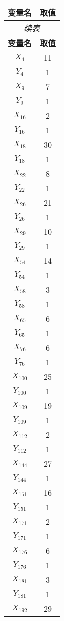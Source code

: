 \documentclass[a4paper,10pt]{article}
\begin{document}
\begin{center}
\begin{longtable}{cc}
\toprule
\textbf{变量名} & \textbf{取值} \\
\midrule
\endfirsthead
\multicolumn{2}{c}{\textit{续表}} \\
\toprule
\textbf{变量名} & \textbf{取值} \\
\midrule
\endhead
\bottomrule
\endfoot
\bottomrule
\endlastfoot
$X_{4}$ & 11 \\
$Y_{4}$ & 1 \\
$X_{9}$ & 7 \\
$Y_{9}$ & 1 \\
$X_{16}$ & 2 \\
$Y_{16}$ & 1 \\
$X_{18}$ & 30 \\
$Y_{18}$ & 1 \\
$X_{22}$ & 8 \\
$Y_{22}$ & 1 \\
$X_{26}$ & 21 \\
$Y_{26}$ & 1 \\
$X_{29}$ & 10 \\
$Y_{29}$ & 1 \\
$X_{54}$ & 14 \\
$Y_{54}$ & 1 \\
$X_{58}$ & 3 \\
$Y_{58}$ & 1 \\
$X_{65}$ & 6 \\
$Y_{65}$ & 1 \\
$X_{76}$ & 6 \\
$Y_{76}$ & 1 \\
$X_{100}$ & 25 \\
$Y_{100}$ & 1 \\
$X_{109}$ & 19 \\
$Y_{109}$ & 1 \\
$X_{112}$ & 2 \\
$Y_{112}$ & 1 \\
$X_{144}$ & 27 \\
$Y_{144}$ & 1 \\
$X_{151}$ & 16 \\
$Y_{151}$ & 1 \\
$X_{171}$ & 2 \\
$Y_{171}$ & 1 \\
$X_{176}$ & 6 \\
$Y_{176}$ & 1 \\
$X_{181}$ & 3 \\
$Y_{181}$ & 1 \\
$X_{192}$ & 29 \\

\end{longtable}
\end{center}
\end{document}
